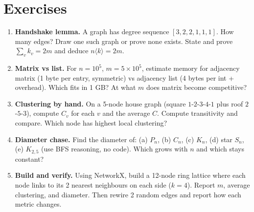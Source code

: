 \section{Exercises}
\label{sec:ch01-exercises}
\begin{enumerate}[label=E1.\arabic*, leftmargin=*, itemsep=0.8em]
    \item \textbf{Handshake lemma.} A graph has degree sequence $[3,2,2,1,1,1]$. How many edges? Draw one such graph or prove none exists. State and prove $\sum_v k_v=2m$ and deduce $n\langle k\rangle=2m$.
    \item \textbf{Matrix vs list.} For $n=10^5$, $m=5\times10^5$, estimate memory for adjacency matrix (1 byte per entry, symmetric) vs adjacency list (4 bytes per int + overhead). Which fits in 1 GB? At what $m$ does matrix become competitive?
    \item \textbf{Clustering by hand.} On a 5-node house graph (square $1$-$2$-$3$-$4$-$1$ plus roof $2$-$5$-$3$), compute $C_v$ for each $v$ and the average $C$. Compute transitivity and compare. Which node has highest local clustering?
    \item \textbf{Diameter chase.} Find the diameter of: (a) $P_n$, (b) $C_n$, (c) $K_n$, (d) star $S_n$, (e) $K_{2,5}$ (use BFS reasoning, no code). Which grows with $n$ and which stays constant?
    \item \textbf{Build and verify.} Using NetworkX, build a 12-node ring lattice where each node links to its 2 nearest neighbours on each side ($k=4$). Report $m$, average clustering, and diameter. Then rewire 2 random edges and report how each metric changes.
\end{enumerate}
